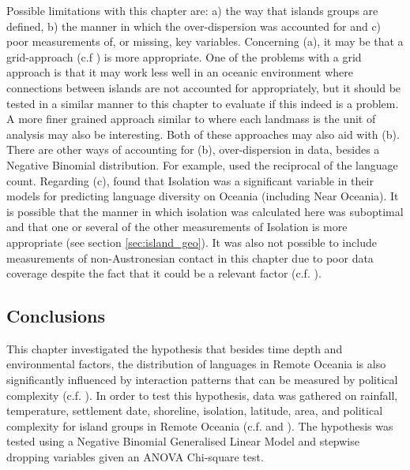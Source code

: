 \documentclass[a4paper,10pt]{article} %
\begin{document}
Possible limitations with this chapter are: a) the way that islands groups are defined, b) the manner in which the over-dispersion was accounted for and c) poor measurements of, or missing, key variables. Concerning (a), it may be that a grid-approach (c.f \citet{hua2019ecological}) is more appropriate. One of the problems with a grid approach is that it may work less well in an oceanic environment where connections between islands are not accounted for appropriately, but it should be tested in a similar manner to this chapter to evaluate if this indeed is a problem. A more finer grained approach similar to  \citet{gavin2012island} where each landmass is the unit of analysis may also be interesting. Both of these approaches may also aid with (b). There are other ways of accounting for (b), over-dispersion in data, besides a Negative Binomial distribution. For example, \citet[4-5]{gavin2012island} used the reciprocal of the language count. Regarding (c), \citet[4-5]{gavin2012island} found that Isolation was a significant variable in their models for predicting language diversity on Oceania (including Near Oceania). It is possible that the manner in which isolation was calculated here was suboptimal and that one or several of the other measurements of Isolation is more appropriate (see section \ref{sec:island_geo}). It was also not possible to include measurements of non-Austronesian contact in this chapter due to poor data coverage despite the fact that it could be a relevant factor (c.f. \citet{lipson_harvad_ancient_dna_vanuatu_2018, posth_jena_ancient_dna_vanuatu_2018}). 
 

\newpage

\subsection{Conclusions}
This chapter investigated the hypothesis that besides time depth and environmental factors, the distribution of languages in Remote Oceania is also significantly influenced by interaction patterns that can be measured by political complexity (c.f. \citet{pawley81, pawley2007}). In order to test this hypothesis, data was gathered on rainfall, temperature, settlement date, shoreline, isolation, latitude, area, and political complexity for island groups in Remote Oceania (c.f. \citet{curriemace2009, gavin2012island, hua2019ecological} and \citet{Pacheco_Coelho_2019}). The hypothesis was tested using a Negative Binomial Generalised Linear Model and stepwise dropping variables given an ANOVA Chi-square test.
\end{document}
